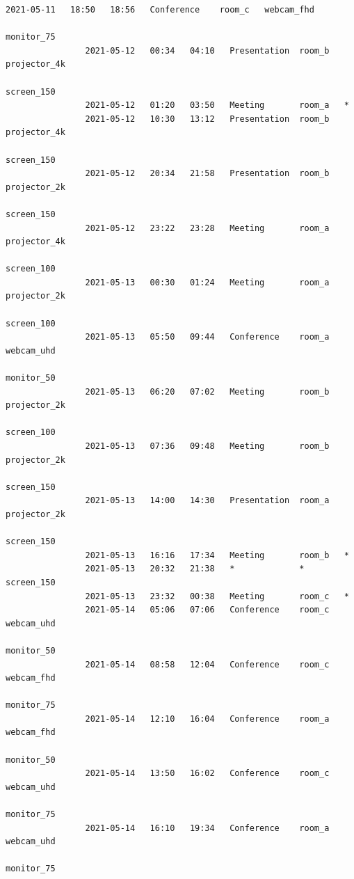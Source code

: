 \documentclass{article}
\begin{document}
\begin{Verbatim}[gobble=8]
                2021-05-11   18:50   18:56   Conference    room_c   webcam_fhd
                                                                    monitor_75
                2021-05-12   00:34   04:10   Presentation  room_b   projector_4k
                                                                    screen_150
                2021-05-12   01:20   03:50   Meeting       room_a   *
                2021-05-12   10:30   13:12   Presentation  room_b   projector_4k
                                                                    screen_150
                2021-05-12   20:34   21:58   Presentation  room_b   projector_2k
                                                                    screen_150
                2021-05-12   23:22   23:28   Meeting       room_a   projector_4k
                                                                    screen_100
                2021-05-13   00:30   01:24   Meeting       room_a   projector_2k
                                                                    screen_100
                2021-05-13   05:50   09:44   Conference    room_a   webcam_uhd
                                                                    monitor_50
                2021-05-13   06:20   07:02   Meeting       room_b   projector_2k
                                                                    screen_100
                2021-05-13   07:36   09:48   Meeting       room_b   projector_2k
                                                                    screen_150
                2021-05-13   14:00   14:30   Presentation  room_a   projector_2k
                                                                    screen_150
                2021-05-13   16:16   17:34   Meeting       room_b   *
                2021-05-13   20:32   21:38   *             *        screen_150
                2021-05-13   23:32   00:38   Meeting       room_c   *
                2021-05-14   05:06   07:06   Conference    room_c   webcam_uhd
                                                                    monitor_50
                2021-05-14   08:58   12:04   Conference    room_c   webcam_fhd
                                                                    monitor_75
                2021-05-14   12:10   16:04   Conference    room_a   webcam_fhd
                                                                    monitor_50
                2021-05-14   13:50   16:02   Conference    room_c   webcam_uhd
                                                                    monitor_75
                2021-05-14   16:10   19:34   Conference    room_a   webcam_uhd
                                                                    monitor_75

\end{Verbatim}
\end{document}
